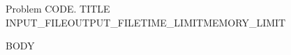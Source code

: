 \clearpage
\begingroup
\def\ShortProblemTitle{}
\begin{problem}{ Problem {{CODE}}. {{TITLE}} }{{{INPUT_FILE}}}{{{OUTPUT_FILE}}}{{{TIME_LIMIT}}}{{{MEMORY_LIMIT}}}
{{BODY}}
\end{problem}
\endgroup
